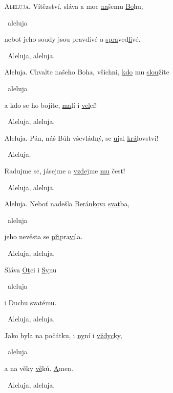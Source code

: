 \begin{psalmus}

\setlength{\parindent}{0pt}

\lettrine{A}{leluja.}
Vítězství, sláva a moc \underline{na}\-še\-mu \underline{Bo}\-hu, 

~aleluja

neboť jeho soudy jsou pravdivé a \underline{spra}\-ved\-\underline{li}\-vé.
 
~Aleluja, aleluja.\vspace{2mm}

Aleluja. 
Chvalte našeho Boha, všichni, \underline{kdo} mu \underline{slou}\-ží\-te 

~aleluja

a kdo se ho bojíte, \underline{ma}\-lí i \underline{vel}\-cí! 

~Aleluja, aleluja.\vspace{2mm}

Aleluja. 
Pán, náš Bůh vševládný, se \underline{u}\-jal \underline{krá}\-lov\-ství! 

~Aleluja.

Radujme se, jásejme a \underline{vzdej}\-me \underline{mu} čest! 

~Aleluja, aleluja.\vspace{2mm}

Aleluja. 
Neboť nadešla Be\-rán\-\underline{ko}\-va \underline{svat}\-ba, 

~aleluja

jeho nevěsta se \underline{při}\-pra\-\underline{vi}\-la. 

~Aleluja, aleluja.\vspace{2mm}

Sláva \underline{Ot}\-ci i \underline{Sy}\-nu 

~aleluja

i \underline{Du}\-chu \underline{sva}\-té\-mu.

~Aleluja, aleluja.\vspace{2mm}

Jako byla na počátku, i \underline{ny}\-ní i \underline{vždyc}\-ky, 

~aleluja

a na věky \underline{vě}\-ků. \underline{A}\-men.

~Aleluja, aleluja. 
\end{psalmus}
